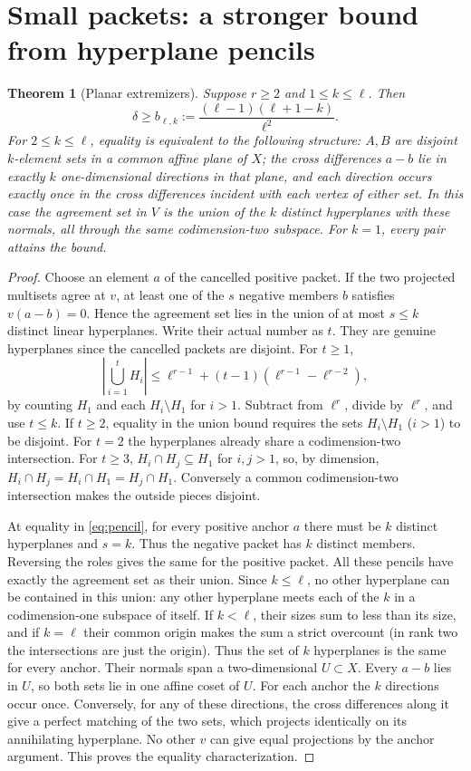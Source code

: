 \documentclass[11pt]{article}
\newtheorem{theorem}{Theorem}[section]
\theoremstyle{remark}\newtheorem{remark}[theorem]{Remark}
\newcommand{\1}{\mathbf 1}
\begin{document}
\section{Small packets: a stronger bound from hyperplane pencils}
\begin{theorem}[Planar extremizers]\label{thm:pencil}
Suppose $r\ge2$ and $1\le k\le\ell$. Then
\begin{equation}\label{eq:pencil}
 \delta\ge b_{\ell,k}:=\frac{(\ell-1)(\ell+1-k)}{\ell^2}.
\end{equation}
For $2\le k\le\ell$, equality is equivalent to the following structure: $A,B$ are disjoint $k$-element sets in a common affine plane of $X$; the cross differences $a-b$ lie in exactly $k$ one-dimensional directions in that plane, and each direction occurs exactly once in the cross differences incident with each vertex of either set. In this case the agreement set in $V$ is the union of the $k$ distinct hyperplanes with these normals, all through the same codimension-two subspace. For $k=1$, every pair attains the bound.
\end{theorem}
\begin{proof}
Choose an element $a$ of the cancelled positive packet. If the two projected multisets agree at $v$, at least one of the $s$ negative members $b$ satisfies $v(a-b)=0$. Hence the agreement set lies in the union of at most $s\le k$ distinct linear hyperplanes. Write their actual number as $t$. They are genuine hyperplanes since the cancelled packets are disjoint. For $t\ge1$,
\[
 \left|\bigcup_{i=1}^{t}H_i\right|
 \le \ell^{r-1}+(t-1)(\ell^{r-1}-\ell^{r-2}),
\]
by counting $H_1$ and each $H_i\setminus H_1$ for $i>1$. Subtract from $\ell^r$, divide by $\ell^r$, and use $t\le k$. If $t\ge2$, equality in the union bound requires the sets $H_i\setminus H_1$ ($i>1$) to be disjoint. For $t=2$ the hyperplanes already share a codimension-two intersection. For $t\ge3$, $H_i\cap H_j\subseteq H_1$ for $i,j>1$, so, by dimension, $H_i\cap H_j=H_i\cap H_1=H_j\cap H_1$. Conversely a common codimension-two intersection makes the outside pieces disjoint.

At equality in \eqref{eq:pencil}, for every positive anchor $a$ there must be $k$ distinct hyperplanes and $s=k$. Thus the negative packet has $k$ distinct members. Reversing the roles gives the same for the positive packet. All these pencils have exactly the agreement set as their union. Since $k\le\ell$, no other hyperplane can be contained in this union: any other hyperplane meets each of the $k$ in a codimension-one subspace of itself. If $k<\ell$, their sizes sum to less than its size, and if $k=\ell$ their common origin makes the sum a strict overcount (in rank two the intersections are just the origin). Thus the set of $k$ hyperplanes is the same for every anchor. Their normals span a two-dimensional $U\subset X$. Every $a-b$ lies in $U$, so both sets lie in one affine coset of $U$. For each anchor the $k$ directions occur once. Conversely, for any of these directions, the cross differences along it give a perfect matching of the two sets, which projects identically on its annihilating hyperplane. No other $v$ can give equal projections by the anchor argument. This proves the equality characterization.
\end{proof}
\end{document}
